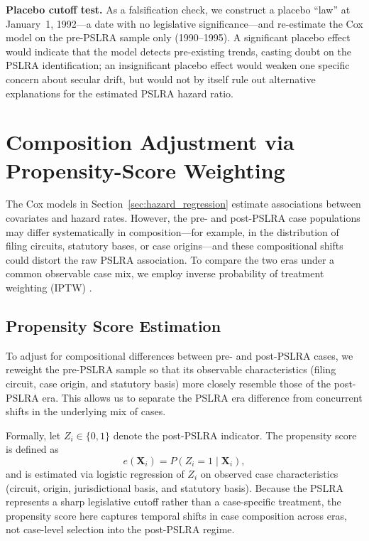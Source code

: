 \textbf{Placebo cutoff test.} As a falsification check, we
construct a placebo ``law'' at January~1, 1992---a date with
no legislative significance---and re-estimate the Cox model
on the pre-PSLRA sample only (1990--1995). A significant
placebo effect would indicate that the model detects
pre-existing trends, casting doubt on the PSLRA
identification; an insignificant placebo effect would weaken
one specific concern about secular drift, but would not by
itself rule out alternative explanations for the estimated PSLRA hazard ratio.

\section{Composition Adjustment via Propensity-Score Weighting}
\label{sec:iptw}

The Cox models in Section~\ref{sec:hazard_regression} estimate associations between
covariates and hazard rates. However, the pre- and post-PSLRA
case populations may differ systematically in composition---for
example, in the distribution of filing circuits, statutory
bases, or case origins---and these compositional shifts could
distort the raw PSLRA association. To compare the two eras
under a common observable case mix,
we employ inverse probability of treatment weighting
(IPTW) \citep{xieliu2005, austinfine2025}.

\subsection{Propensity Score Estimation}

To adjust for compositional differences between pre- and
post-PSLRA cases, we reweight the pre-PSLRA sample so that its
observable characteristics (filing circuit, case origin, and
statutory basis) more closely resemble those of the post-PSLRA
era. This allows us to separate the PSLRA era difference from
concurrent shifts in the underlying mix of cases.

Formally, let $Z_i \in \{0,1\}$ denote the post-PSLRA indicator.
The propensity score is defined as
\begin{equation}
e(\mathbf{X}_i) = P(Z_i = 1 \mid \mathbf{X}_i),
\end{equation}
and is estimated via logistic regression of $Z_i$ on observed case
characteristics (circuit, origin, jurisdictional basis, and
statutory basis). Because the PSLRA represents a sharp legislative
cutoff rather than a case-specific treatment, the propensity score
here captures temporal shifts in case composition across eras, not
case-level selection into the post-PSLRA regime.


